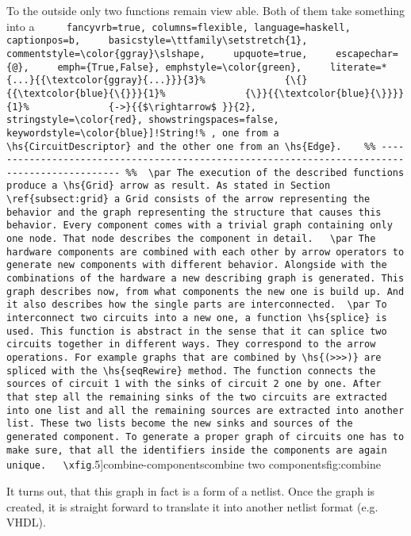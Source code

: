 \documentclass[11pt,final,a4paper]{article}
\makeatletter
\newcommand{\hs}[1]{%
  \lstinline[
    fancyvrb=true, columns=flexible, language=haskell,
    captionpos=b,
    basicstyle=\ttfamily\setstretch{1},
    commentstyle=\color{ggray}\slshape,
    upquote=true,
    escapechar={@},
    emph={True,False}, emphstyle=\color{green},
    literate=*{...}{{\textcolor{ggray}{...}}}{3}%
             {\{}{{\textcolor{blue}{\{}}}{1}%
             {\}}{{\textcolor{blue}{\}}}}{1}%
             {->}{{$\rightarrow$ }}{2},
    stringstyle=\color{red}, showstringspaces=false,
    keywordstyle=\color{blue}]!#1!%
}
\newcommand{\xfig}[4][0.9] {%
    \begin{figure}[ht]
        \begin{center}
            \graphicspath{{./}{Images/}}
            \scalebox{#1}{%
                
            }
            \caption{\label{#4} #3}
        \end{center}
    \end{figure}
}
\makeatother
\begin{document}
\par
To the outside only two functions remain view able. Both of them take something into a \hs{String}, one from a \hs{CircuitDescriptor} and the other one from an \hs{Edge}.




\par
The execution of the described functions produce a \hs{Grid} arrow as result. As stated in Section \ref{subsect:grid} a Grid
consists of the arrow representing the behavior and the graph representing the structure that causes this behavior. Every
component comes with a trivial graph containing only one node. That node describes the component in detail. 

\par
The hardware components are combined with each other by arrow operators to generate new components with different
behavior. Alongside with the combinations of the hardware a new describing graph is generated. This graph describes now, from what
components the new one is build up. And it also describes how the single parts are interconnected.

\par
To interconnect two circuits into a new one, a function \hs{splice} is used. This function is abstract in the sense that it can
splice two circuits together in different ways. They correspond to the arrow operations. For example graphs that are combined by
\hs{(>>>)} are spliced with the \hs{seqRewire} method. The function connects the sources of circuit 1 with the sinks of circuit 2
one by one. After that step all the remaining sinks of the two circuits are extracted into one list and all the remaining sources
are extracted into another list. These two lists become the new sinks and sources of the generated component. To generate a proper
graph of circuits one has to make sure, that all the identifiers inside the components are again unique. 

\xfig[.5]{combine-components}{combine two components}{fig:combine}

\par
It turns out, that this graph in fact is a form of a netlist. Once the graph is created, it is straight forward to translate it
into another netlist format (e.g. VHDL).

\end{document}
